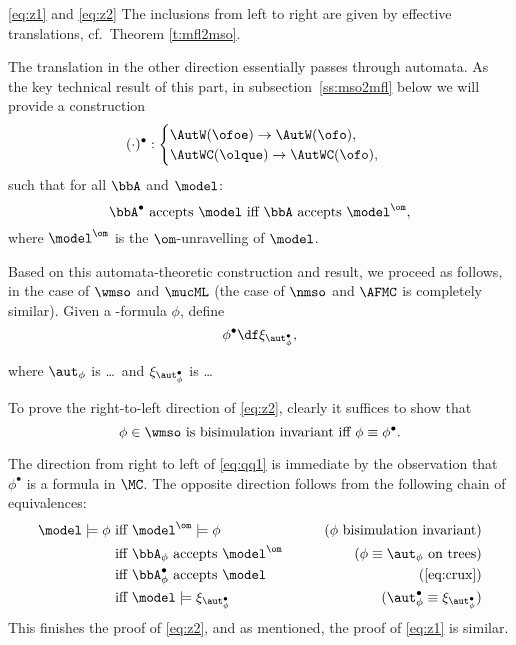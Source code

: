 \begin{proofof}{\eqref{eq:z1} and \eqref{eq:z2}}
The inclusions from left to right are given by effective translations,
cf.~Theorem \ref{t:mfl2mso}.

The translation in the other direction essentially passes through automata.
As the key technical result of this part, in subsection~\ref{ss:mso2mfl} below
we will provide a construction 
\[(\cdot)^{\bullet}: \begin{cases} \AutW(\ofoe) \to
\AutW(\ofo), \\
\AutWC(\olque) \to
\AutWC(\ofo), \\
\end{cases}\] 
such that for all $\bbA$ and $\model$: %
\begin{equation}
\label{eq:crux}
\bbA^{\bullet} \text{ accepts } \model \text{ iff } \bbA \text{ accepts
} \model^{\om},
\end{equation}
where $\model^{\om}$ is the $\om$-unravelling of $\model$.
 
Based on this automata-theoretic construction and result, we proceed as follows,
in the case of $\wmso$ and $\mucML$ (the case of $\nmso$ and $\AFMC$ is 
completely similar).
Given a \wmso-formula $\phi$, define 
\[
\phi^{\bullet} \df \xi_{\aut_{\phi}^{\bullet}},
\]
\btbs
\item
where $\aut_{\phi}$ is \ldots\ and $\xi_{\aut_{\phi}^{\bullet}}$ is \ldots
\etbs

To prove the right-to-left direction of \eqref{eq:z2}, clearly it suffices to
show that
\begin{equation}
\label{eq:qq1}
\phi\in\wmso \text{ is bisimulation invariant iff } \phi \equiv \phi^{\bullet}.
\end{equation}

The direction from right to left of \eqref{eq:qq1} is immediate by the 
observation that $\phi^{\bullet}$ is a formula in $\MC$.
The opposite direction follows from the following chain of equivalences:
\begin{align*}
\model \models \phi
  & \text{ iff } \model^{\om} \models \phi
  & \tag{$\phi$ bisimulation invariant}
\\ & \text{ iff }  \bbA_{\phi} \text{ accepts } \model^{\om}
  & \tag{$ \phi \equiv \aut_{\phi}$ on trees}
\\ & \text{ iff } \bbA_{\phi}^{\bullet} \text{ accepts } \model
& \tag{\ref{eq:crux}}
\\ & \text{ iff }  \model \models \xi_{ \aut_{\phi}^{\bullet}}
& \tag{$\aut_{\phi}^{\bullet}\equiv \xi_{ \aut_{\phi}^{\bullet}}$}
\end{align*}
This finishes the proof of \eqref{eq:z2}, and as mentioned, the proof of
\eqref{eq:z1} is similar.
\end{proofof}


